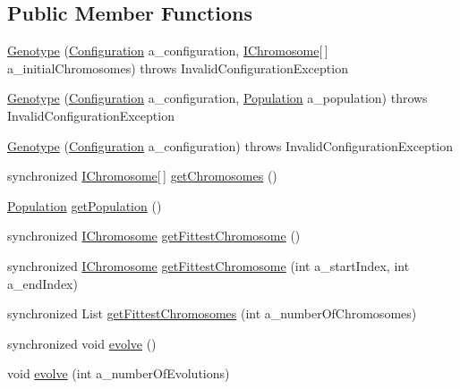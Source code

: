 \subsection*{Public Member Functions}
\begin{DoxyCompactItemize}
\item 
\hyperlink{classorg_1_1jgap_1_1_genotype_a00b11af9a68e9d84bbc52afbf661607f}{Genotype} (\hyperlink{classorg_1_1jgap_1_1_configuration}{Configuration} a\-\_\-configuration, \hyperlink{interfaceorg_1_1jgap_1_1_i_chromosome}{I\-Chromosome}\mbox{[}$\,$\mbox{]} a\-\_\-initial\-Chromosomes)  throws Invalid\-Configuration\-Exception 
\item 
\hyperlink{classorg_1_1jgap_1_1_genotype_a7b08ffd2154cd3ccc8636b795666c996}{Genotype} (\hyperlink{classorg_1_1jgap_1_1_configuration}{Configuration} a\-\_\-configuration, \hyperlink{classorg_1_1jgap_1_1_population}{Population} a\-\_\-population)  throws Invalid\-Configuration\-Exception 
\item 
\hyperlink{classorg_1_1jgap_1_1_genotype_afc52d6b649eea1eefd92e376ea3762ff}{Genotype} (\hyperlink{classorg_1_1jgap_1_1_configuration}{Configuration} a\-\_\-configuration)  throws Invalid\-Configuration\-Exception 
\item 
synchronized \hyperlink{interfaceorg_1_1jgap_1_1_i_chromosome}{I\-Chromosome}\mbox{[}$\,$\mbox{]} \hyperlink{classorg_1_1jgap_1_1_genotype_ad6795433da5538c6f520253ff9d2382e}{get\-Chromosomes} ()
\item 
\hyperlink{classorg_1_1jgap_1_1_population}{Population} \hyperlink{classorg_1_1jgap_1_1_genotype_a8241b2d89d32b283abe5c9b42974d64d}{get\-Population} ()
\item 
synchronized \hyperlink{interfaceorg_1_1jgap_1_1_i_chromosome}{I\-Chromosome} \hyperlink{classorg_1_1jgap_1_1_genotype_a05380af4c0737841c09d3a5533f9f942}{get\-Fittest\-Chromosome} ()
\item 
synchronized \hyperlink{interfaceorg_1_1jgap_1_1_i_chromosome}{I\-Chromosome} \hyperlink{classorg_1_1jgap_1_1_genotype_a6c40835533352287db8d34e5fae6875f}{get\-Fittest\-Chromosome} (int a\-\_\-start\-Index, int a\-\_\-end\-Index)
\item 
synchronized List \hyperlink{classorg_1_1jgap_1_1_genotype_a602d6b1413007ef28880cf88ccd2f912}{get\-Fittest\-Chromosomes} (int a\-\_\-number\-Of\-Chromosomes)
\item 
synchronized void \hyperlink{classorg_1_1jgap_1_1_genotype_a54a6791fbb6e13920e79f4e2dd719eb4}{evolve} ()
\item 
void \hyperlink{classorg_1_1jgap_1_1_genotype_ab15d88cf1a6084f9efea2dc935968471}{evolve} (int a\-\_\-number\-Of\-Evolutions)

\end{DoxyCompactItemize}
